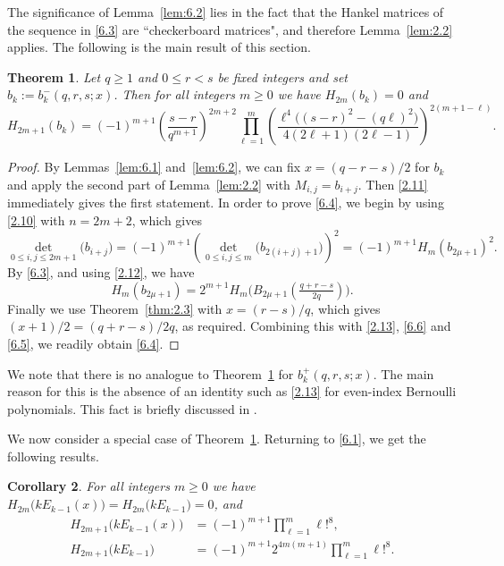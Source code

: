 \documentclass{amsart}
\theoremstyle{plain}
\newtheorem{theorem}{Theorem}[section]
\newtheorem{corollary}[theorem]{Corollary}
\numberwithin{equation}{section}
\begin{document}
The significance of Lemma~\ref{lem:6.2} lies in the fact that the Hankel
matrices of the sequence in \eqref{6.3} are ``checkerboard matrices", and
therefore Lemma~\ref{lem:2.2} applies. The following is the main result of this
section.

\begin{theorem}\label{thm:6.3}
Let $q\geq 1$ and $0\leq r<s$ be fixed integers and set 
$b_k:=b_k^{-}(q,r,s;x)$. Then for all integers $m\geq 0$ we have 
$H_{2m}(b_k)=0$ and
\begin{equation}\label{6.4}
H_{2m+1}(b_k)=(-1)^{m+1}\left(\frac{s-r}{q^{m+1}}\right)^{2m+2}\prod_{\ell=1}^m
\left(\frac{\ell^4\big((s-r)^2-(q\ell)^2\big)}{4(2\ell+1)(2\ell-1)}\right)^{2(m+1-\ell)}.
\end{equation}
\end{theorem}

\begin{proof}
By Lemmas~\ref{lem:6.1} and~\ref{lem:6.2}, we can fix $x=(q-r-s)/2$ for $b_k$ and apply the second part of Lemma~\ref{lem:2.2} with $M_{i,j}=b_{i+j}$. Then
\eqref{2.11} immediately gives the first statement. In order to prove 
\eqref{6.4}, we begin by using \eqref{2.10} with $n=2m+2$, which gives
\begin{equation}\label{6.5}
\det_{0\leq i,j\leq 2m+1}\big(b_{i+j}\big)
= (-1)^{m+1}\left(\det_{0\leq i,j\leq m}\big(b_{2(i+j)+1}\big)\right)^2
= (-1)^{m+1}H_m(b_{2\mu+1})^2.
\end{equation}
By \eqref{6.3}, and using \eqref{2.12}, we have
\begin{equation}\label{6.6}
H_m(b_{2\mu+1}) = 2^{m+1}H_m\big(B_{2\mu+1}(\tfrac{q+r-s}{2q})\big).
\end{equation}
Finally we use Theorem~\ref{thm:2.3} with $x=(r-s)/q$, which gives 
$(x+1)/2=(q+r-s)/2q$, as required. Combining this with \eqref{2.13}, \eqref{6.6}
and \eqref{6.5}, we readily obtain \eqref{6.4}.
\end{proof}

We note that there is no analogue to Theorem~\ref{thm:6.3} for
$b_k^{+}(q,r,s;x)$. The main reason for this is the absence of an identity such
as \eqref{2.13} for even-index Bernoulli polynomials. This fact is briefly
discussed in \cite[Ch.~4]{DJ}. 

We now consider a special case of Theorem~\ref{thm:6.3}. Returning to 
\eqref{6.1}, we get the following results.

\begin{corollary}\label{cor:6.4}
For all integers $m\geq 0$ we have 
$H_{2m}\big(kE_{k-1}(x)\big)=H_{2m}\big(kE_{k-1}\big)=0$, and
\begin{align}
H_{2m+1}\big(kE_{k-1}(x)\big)
&= (-1)^{m+1}\prod_{\ell=1}^m\ell!^{8},\label{6.7} \\
H_{2m+1}\big(kE_{k-1}\big)
&= (-1)^{m+1}2^{4m(m+1)}\prod_{\ell=1}^m\ell!^{8}.\label{6.8}
\end{align}
\end{corollary}
\end{document}
